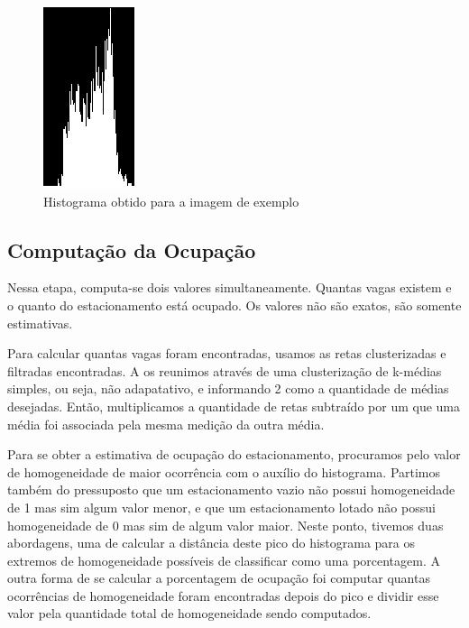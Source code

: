 \documentclass[10pt,twocolumn,letterpaper]{article}
\begin{document}
\begin{figure}[!htp]
\centering
\includegraphics[width=0.33\columnwidth]{hist-ocupacao.jpg}
 \caption{Histograma obtido para a imagem de exemplo}
\label{fig:hist}
\end{figure}

\subsection{Computação da Ocupação}

	Nessa etapa, computa-se dois valores simultaneamente. Quantas vagas existem e o quanto
do estacionamento está ocupado. Os valores não são exatos, são somente estimativas.

	Para calcular quantas vagas foram encontradas, usamos as retas clusterizadas e filtradas
encontradas. A os reunimos através de uma clusterização de k-médias simples, ou seja, não
adapatativo, e informando 2 como a quantidade de médias desejadas. Então, multiplicamos
a quantidade de retas subtraído por um que uma média foi associada pela mesma medição da
outra média.

	Para se obter a estimativa de ocupação do estacionamento, procuramos pelo valor de
homogeneidade de maior ocorrência com o auxílio do histograma. Partimos também do
pressuposto que um estacionamento vazio não possui homogeneidade de 1 mas sim algum
valor menor, e que um estacionamento lotado não possui homogeneidade de 0 mas sim de
algum valor maior. Neste ponto, tivemos duas abordagens, uma de calcular a distância deste
pico do histograma para os extremos de homogeneidade possíveis de classificar como uma
porcentagem. A outra forma de se calcular a porcentagem de ocupação foi computar quantas
ocorrências de homogeneidade foram encontradas depois do pico e dividir esse valor pela
quantidade total de homogeneidade sendo computados.
\end{document}

